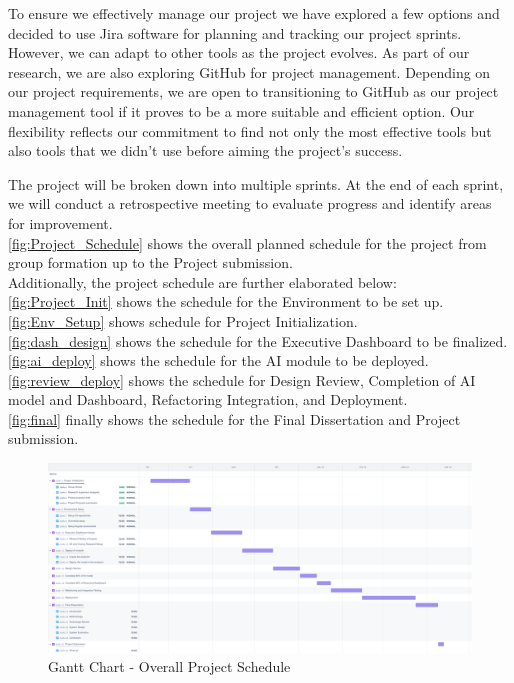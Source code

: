 \documentclass{report}
\begin{document}
To ensure we effectively manage our project we have explored a few options and decided to use  Jira software for planning and tracking our project sprints. However, we can adapt to other tools as the project evolves. As part of our research, we are also exploring GitHub for project management. Depending on our project requirements, we are open to transitioning to GitHub as our project management tool if it proves to be a more suitable and efficient option. Our flexibility reflects our commitment to find not only the most effective tools but also tools that we didn't use before aiming the project's success.

The project will be broken down into multiple sprints. At the end of each sprint, we will conduct a retrospective meeting to evaluate progress and identify areas for improvement.\\
\autoref{fig:Project_Schedule} shows the overall planned schedule for the project from group formation up to the Project submission. \\
Additionally, the project schedule are further elaborated below:\\
\autoref{fig:Project_Init} shows the schedule for the Environment to be set up.\\
\autoref{fig:Env_Setup} shows schedule for Project Initialization. \\
\autoref{fig:dash_design}  shows the schedule for the Executive Dashboard to be finalized. \\
\autoref{fig:ai_deploy} shows the schedule for the AI module to be deployed. \\
\autoref{fig:review_deploy} shows the schedule for Design Review, Completion of AI model and Dashboard, Refactoring Integration, and Deployment.\\
\autoref{fig:final} finally shows the schedule for the Final Dissertation and Project submission.\\

\begin{figure}[h]
\includegraphics[scale=0.1]{images/gantt.png}
\caption{Gantt Chart - Overall Project Schedule}
\label{fig:Project_Schedule}
\centering
\end{figure}
\end{document}
